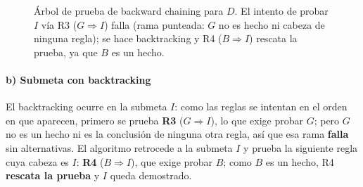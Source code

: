 \begin{figure}[H]
\centering
{}
\caption{Árbol de prueba de backward chaining para $D$. El intento de probar $I$ vía R3 ($G\Rightarrow
I$) falla (rama punteada: $G$ no es hecho ni cabeza de ninguna regla); se hace backtracking y R4
($B\Rightarrow I$) rescata la prueba, ya que $B$ es un hecho.}
\end{figure}

\paragraph{b) Submeta con backtracking}
El backtracking ocurre en la submeta \textbf{$I$}: como las reglas se intentan en el orden en que
aparecen, primero se prueba \textbf{R3} ($G\Rightarrow I$), lo que exige probar $G$; pero $G$ no es
un hecho ni es la conclusión de ninguna otra regla, así que esa rama \textbf{falla} sin alternativas.
El algoritmo retrocede a la submeta $I$ y prueba la siguiente regla cuya cabeza es $I$: \textbf{R4}
($B\Rightarrow I$), que exige probar $B$; como $B$ es un hecho, R4 \textbf{rescata la prueba} y $I$
queda demostrado.

